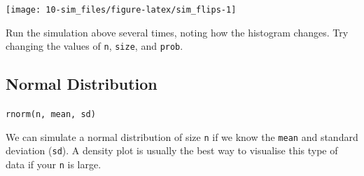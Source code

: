 \documentclass[
  oneside]{book}
\begin{document}
\begin{center}\texttt{[image: 10-sim\_files/figure-latex/sim\_flips-1]} \end{center}

\begin{try}
Run the simulation above several times, noting how the histogram changes. Try changing the values of \texttt{n}, \texttt{size}, and \texttt{prob}.

\end{try}

\hypertarget{normal}{%
\subsection{Normal Distribution}\label{normal}}

\texttt{rnorm(n,\ mean,\ sd)}

We can simulate a normal distribution of size \texttt{n} if we know the \texttt{mean} and standard deviation (\texttt{sd}). A density plot is usually the best way to visualise this type of data if your \texttt{n} is large.
\end{document}
